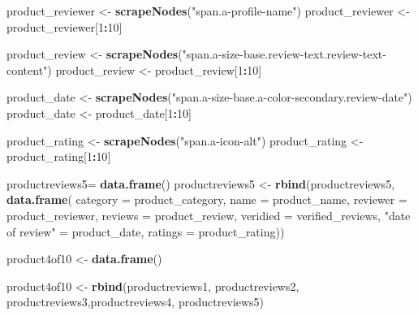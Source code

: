 \documentclass[
]{article}
\newenvironment{Shaded}{\begin{snugshade}}{\end{snugshade}}
\newcommand{\AttributeTok}[1]{\textcolor[rgb]{0.13,0.29,0.53}{#1}}
\newcommand{\DecValTok}[1]{\textcolor[rgb]{0.00,0.00,0.81}{#1}}
\newcommand{\FunctionTok}[1]{\textcolor[rgb]{0.13,0.29,0.53}{\textbf{#1}}}
\newcommand{\NormalTok}[1]{#1}
\newcommand{\OtherTok}[1]{\textcolor[rgb]{0.56,0.35,0.01}{#1}}
\newcommand{\SpecialCharTok}[1]{\textcolor[rgb]{0.81,0.36,0.00}{\textbf{#1}}}
\newcommand{\StringTok}[1]{\textcolor[rgb]{0.31,0.60,0.02}{#1}}
\begin{document}
\begin{Shaded}
\begin{Highlighting}[]
\NormalTok{  product\_reviewer }\OtherTok{\textless{}{-}} \FunctionTok{scrapeNodes}\NormalTok{(}\StringTok{"span.a{-}profile{-}name"}\NormalTok{)}
\NormalTok{  product\_reviewer }\OtherTok{\textless{}{-}}\NormalTok{ product\_reviewer[}\DecValTok{1}\SpecialCharTok{:}\DecValTok{10}\NormalTok{]}
  
\NormalTok{  product\_review }\OtherTok{\textless{}{-}} \FunctionTok{scrapeNodes}\NormalTok{(}\StringTok{"span.a{-}size{-}base.review{-}text.review{-}text{-}content"}\NormalTok{)}
\NormalTok{  product\_review }\OtherTok{\textless{}{-}}\NormalTok{ product\_review[}\DecValTok{1}\SpecialCharTok{:}\DecValTok{10}\NormalTok{]}
  
\NormalTok{  product\_date }\OtherTok{\textless{}{-}} \FunctionTok{scrapeNodes}\NormalTok{(}\StringTok{"span.a{-}size{-}base.a{-}color{-}secondary.review{-}date"}\NormalTok{)}
\NormalTok{  product\_date }\OtherTok{\textless{}{-}}\NormalTok{ product\_date[}\DecValTok{1}\SpecialCharTok{:}\DecValTok{10}\NormalTok{]}
  
\NormalTok{  product\_rating }\OtherTok{\textless{}{-}} \FunctionTok{scrapeNodes}\NormalTok{(}\StringTok{"span.a{-}icon{-}alt"}\NormalTok{)}
\NormalTok{  product\_rating }\OtherTok{\textless{}{-}}\NormalTok{ product\_rating[}\DecValTok{1}\SpecialCharTok{:}\DecValTok{10}\NormalTok{]}
  
\NormalTok{  productreviews5}\OtherTok{=} \FunctionTok{data.frame}\NormalTok{()}
\NormalTok{  productreviews5 }\OtherTok{\textless{}{-}} \FunctionTok{rbind}\NormalTok{(productreviews5, }\FunctionTok{data.frame}\NormalTok{(}
                      \AttributeTok{category =}\NormalTok{ product\_category,}
                      \AttributeTok{name =}\NormalTok{ product\_name,}
                      \AttributeTok{reviewer =}\NormalTok{ product\_reviewer,}
                      \AttributeTok{reviews =}\NormalTok{ product\_review,}
                      \AttributeTok{veridied =}\NormalTok{ verified\_reviews,}
                      \StringTok{"date of review"} \OtherTok{=}\NormalTok{ product\_date,}
                      \AttributeTok{ratings =}\NormalTok{ product\_rating))}
  
\NormalTok{  product4of10 }\OtherTok{\textless{}{-}} \FunctionTok{data.frame}\NormalTok{()}
  
\NormalTok{  product4of10 }\OtherTok{\textless{}{-}} \FunctionTok{rbind}\NormalTok{(productreviews1, productreviews2, productreviews3,productreviews4, productreviews5)}
\end{Highlighting}
\end{Shaded}
\end{document}
